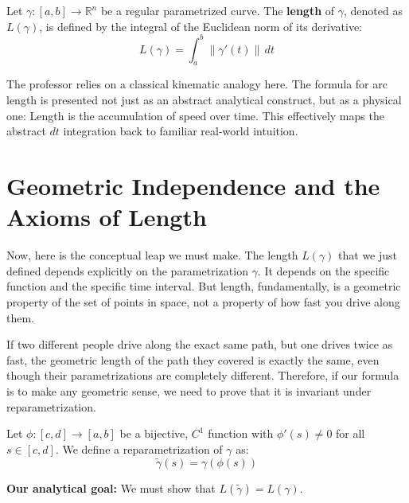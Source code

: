 \begin{orange-formula}
\begin{definition}
Let $\gamma: [a, b] \to \mathbb{R}^n$ be a regular parametrized curve. The \textbf{length} of $\gamma$, denoted as $L(\gamma)$, is defined by the integral of the Euclidean norm of its derivative:
\begin{equation} \label{eq:arc_length}
L(\gamma) = \int_a^b \|\gamma'(t)\| \, dt
\end{equation}
\end{definition}
\end{orange-formula}

\begin{didactic-insight}
The professor relies on a classical kinematic analogy here. The formula for arc length is presented not just as an abstract analytical construct, but as a physical one: Length is the accumulation of speed over time. This effectively maps the abstract $dt$ integration back to familiar real-world intuition.
\end{didactic-insight}


\section{Geometric Independence and the Axioms of Length}

\begin{spoken-clean}[07:15 - 09:30]
Now, here is the conceptual leap we must make. The length $L(\gamma)$ that we just defined depends explicitly on the parametrization $\gamma$. It depends on the specific function and the specific time interval. But length, fundamentally, is a geometric property of the set of points in space, not a property of how fast you drive along them. 

If two different people drive along the exact same path, but one drives twice as fast, the geometric length of the path they covered is exactly the same, even though their parametrizations are completely different. Therefore, if our formula is to make any geometric sense, we need to prove that it is invariant under reparametrization.
\end{spoken-clean}

\begin{math-stroke}
Let $\phi: [c, d] \to [a, b]$ be a bijective, $C^1$ function with $\phi'(s) \neq 0$ for all $s \in [c, d]$.
We define a reparametrization of $\gamma$ as:
\[
\tilde{\gamma}(s) = \gamma(\phi(s))
\]

\textbf{Our analytical goal:} We must show that $L(\tilde{\gamma}) = L(\gamma)$.
\end{math-stroke}

